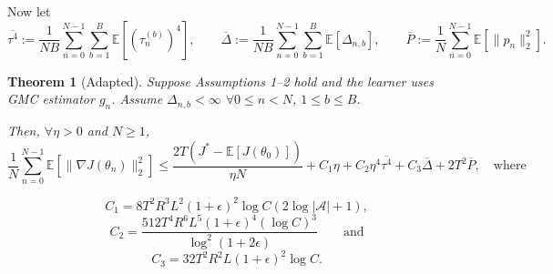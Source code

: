 \documentclass[10pt]{article}
\newcommand{\E}{\mathbb{E}}
\newcommand{\grad}{\nabla}
\theoremstyle{preserved}
\newtheorem{theorem}{Theorem}
\begin{document}
Now let
\begin{equation*}
\overline{\tau^4}:=\frac1{NB}\sum_{n=0}^{N-1}\sum_{b=1}^B\E[(\tau_n^{(b)})^4],\qquad
\overline\Delta:=\frac1{NB}\sum_{n=0}^{N-1}\sum_{b=1}^B\E[\Delta_{n,b}],\qquad
\overline P:=\frac1N\sum_{n=0}^{N-1}\E[\|p_n\|_2^2].
\end{equation*}
\begin{theorem}[Adapted] Suppose Assumptions 1--2 hold and the learner uses GMC estimator $g_n$. Assume $\Delta_{n,b}<\infty$ $\forall 0\le n<N$, $1\le b\le B$.

Then, $\forall\eta>0$ and $N\ge1$,
\begin{equation*}
\frac1N\sum_{n=0}^{N-1}\E[\|\grad J(\theta_n)\|_2^2]
\le\frac{2T(J^*-\E[J(\theta_0)])}{\eta N}+C_1\eta+C_2\eta^4\overline{\tau^4}+C_3\overline\Delta+2T^2\overline P,
\quad\text{where}
\end{equation*}

\begin{equation*}
C_1=8T^2R^3L^2(1+\epsilon)^2\log C(2\log|\mathcal A|+1),
\end{equation*}
\begin{equation*}
C_2=\frac{512T^4R^6L^5(1+\epsilon)^4(\log C)^3}{\log^2(1+2\epsilon)}\qquad\text{and}
\end{equation*}
\begin{equation*}
C_3=32T^2R^2L(1+\epsilon)^2\log C.
\end{equation*}
\end{theorem}
\end{document}
